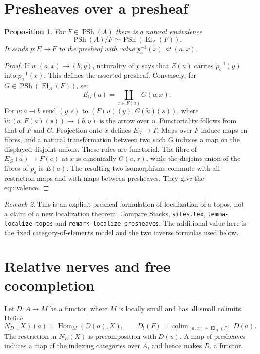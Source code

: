 \documentclass[11pt]{amsart}
\newtheorem{proposition}{Proposition}[section]
\theoremstyle{remark}
\newtheorem{remark}[proposition]{Remark}
\newcommand{\PSh}{\operatorname{PSh}}
\newcommand{\El}{\operatorname{El}}
\newcommand{\Hom}{\operatorname{Hom}}
\newcommand{\PSM}[1]{\par\smallskip{\small\raggedright\noindent Source-map identifiers: \texttt{#1}.\par}\smallskip}
\begin{document}
\section{Presheaves over a presheaf}
\label{psm-slice-section}

\begin{proposition}\label{psm-slice-equivalence}
For $F\in\PSh(A)$ there is a natural equivalence
\[
 \PSh(A)/F\simeq\PSh(\El_A(F)).
\]
It sends $p:E\to F$ to the presheaf with value $p_a^{-1}(x)$ at $(a,x)$.
\end{proposition}
\PSM{PSM-PROP-0008}
\begin{proof}
If $u:(a,x)\to(b,y)$, naturality of $p$ says that $E(u)$ carries
$p_b^{-1}(y)$ into $p_a^{-1}(x)$. This defines the asserted presheaf.
Conversely, for $G\in\PSh(\El_A(F))$, set
\[
 E_G(a)=\coprod_{x\in F(a)}G(a,x).
\]
For $u:a\to b$ send $(y,s)$ to
$(F(u)(y),G(\widetilde u)(s))$, where
$\widetilde u:(a,F(u)(y))\to(b,y)$ is the arrow over $u$.
Functoriality follows from that of $F$ and $G$.
Projection onto $x$ defines $E_G\to F$.
Maps over $F$ induce maps on fibres, and a natural transformation between
two such $G$ induces a map on the displayed disjoint unions. These rules
are functorial. The fibre of $E_G(a)\to F(a)$ at $x$ is canonically
$G(a,x)$, while the disjoint union of the fibres of $p_a$ is $E(a)$.
The resulting two isomorphisms commute with all restriction maps and
with maps between presheaves. They give the equivalence.
\end{proof}

\begin{remark}
This is an explicit presheaf formulation of localization of a topos,
not a claim of a new localization theorem. Compare Stacks,
\nolinkurl{sites.tex}, \nolinkurl{lemma-localize-topos} and
\nolinkurl{remark-localize-presheaves}. The additional value here is the
fixed category-of-elements model and the two inverse formulas used below.
\end{remark}

\section{Relative nerves and free cocompletion}
\label{psm-realization-section}

Let $D:A\to M$ be a functor, where $M$ is locally small and has all
small colimits. Define
\[
 N_D(X)(a)=\Hom_M(D(a),X),\qquad
 D_!(F)=\mathop{\mathrm{colim}}_{(a,x)\in\El_A(F)}D(a).
\]
The restriction in $N_D(X)$ is precomposition with $D(u)$.
A map of presheaves induces a map of the indexing categories over $A$,
and hence makes $D_!$ a functor.
\end{document}
